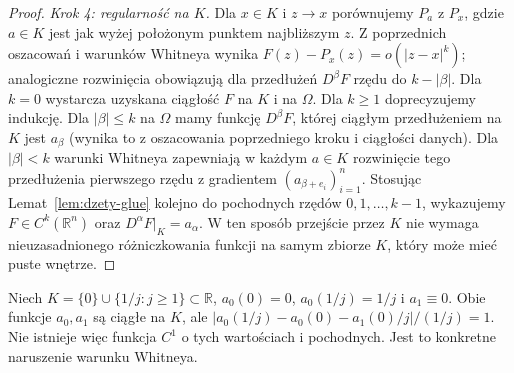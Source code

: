 \begin{proof}
\emph{Krok 4: regularność na $K$.}
Dla $x\in K$ i $z\to x$ porównujemy $P_a$ z $P_x$,
gdzie $a\in K$ jest jak wyżej położonym punktem najbliższym
$z$. Z poprzednich oszacowań i warunków Whitneya wynika
$F(z)-P_x(z)=o(|z-x|^k)$; analogiczne rozwinięcia
obowiązują dla przedłużeń $D^\beta F$ rzędu do
$k-|\beta|$. Dla $k=0$ wystarcza uzyskana ciągłość $F$ na $K$
i na $\Omega$. Dla $k\ge1$ doprecyzujemy indukcję.
Dla
$|\beta|\le k$ na $\Omega$ mamy funkcję
$D^\beta F$, której ciągłym przedłużeniem na $K$
jest $a_\beta$ (wynika to z oszacowania poprzedniego
kroku i ciągłości danych). Dla $|\beta|<k$ warunki
Whitneya zapewniają w każdym $a\in K$ rozwinięcie
tego przedłużenia pierwszego rzędu z gradientem
$(a_{\beta+e_i})_{i=1}^n$. Stosując
Lemat~\ref{lem:dzety-glue} kolejno do pochodnych
rzędów $0,1,\ldots,k-1$, wykazujemy
$F\in C^k(\mathbb R^n)$ oraz $D^\alpha F|_K=a_\alpha$.
W ten sposób przejście przez $K$ nie wymaga
nieuzasadnionego różniczkowania funkcji na samym zbiorze
$K$, który może mieć puste wnętrze.
\end{proof}

\begin{przyklad}
Niech $K=\{0\}\cup\{1/j:j\ge1\}\subset\mathbb R$,
$a_0(0)=0$, $a_0(1/j)=1/j$ i $a_1\equiv0$.
Obie funkcje $a_0,a_1$ są ciągłe na $K$, ale
$|a_0(1/j)-a_0(0)-a_1(0)/j|/(1/j)=1$.
Nie istnieje więc funkcja $C^1$ o tych wartościach i
pochodnych. Jest to konkretne naruszenie warunku Whitneya.
\end{przyklad}

